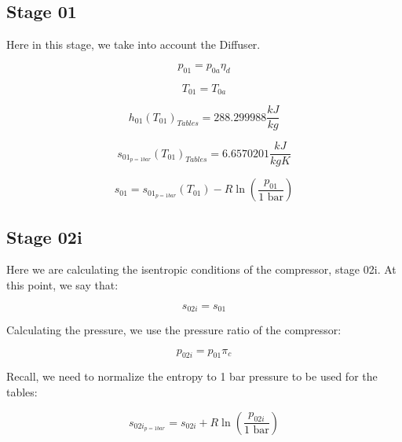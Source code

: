 \documentclass[titlepage]{article}
\begin{document}
    \subsection{Stage 01}

    Here in this stage, we take into account the Diffuser. 

    \begin{equation} 
        p_{01} = p_{0a} \eta_{d}
    \end{equation}

    \begin{equation}
        T_{01} = T_{0a} 
    \end{equation}

    \begin{equation}
        h_{01}(T_{01})_{Tables} = 288.299988 \frac{kJ}{kg}
    \end{equation}

    \begin{equation}
        s_{01_{p= 1 bar}}(T_{01})_{Tables} = 6.6570201 \frac{kJ}{kg K}
    \end{equation}

    \begin{equation}
        s_{01} = s_{01_{p=1 bar}}(T_{01}) - R \ln \left( \frac{p_{01}}{1 \text{ bar}} \right)
    \end{equation}

    \subsection{Stage 02i}

    Here we are calculating the isentropic conditions of the compressor, stage 02i. At this point, we say that:

    \begin{equation}
        s_{02i} = s_{01}
    \end{equation}

    Calculating the pressure, we use the pressure ratio of the compressor:

    \begin{equation}
        p_{02i} = p_{01} \pi_{c}
    \end{equation}

    Recall, we need to normalize the entropy to 1 bar pressure to be used for the tables:

    \begin{equation}
        s_{02i_{p=1 bar}} =  s_{02i}+ R \ln \left( \frac{p_{02i}}{1 \text{ bar}} \right)
    \end{equation}
\end{document}

